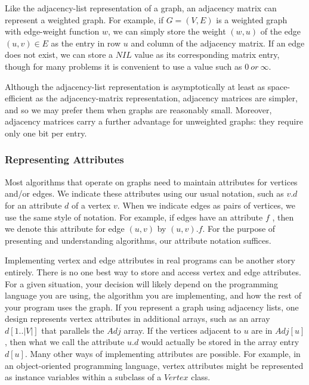\documentclass[12pt,a4paper]{book}
\begin{document}
Like the adjacency-list representation of a graph, an adjacency matrix can represent a weighted graph. For example, if $G = (V, E)$ is a weighted graph with edge-weight function $w$, we can simply store the weight $(w, u)$ of the edge $(u,v) \in E$ as the entry in row $u$ and column of the adjacency matrix. If an edge does not exist, we can store a $NIL$ value as its corresponding matrix entry, though for many problems it is convenient to use a value such as $0\ or\ \infty$.\par
Although the adjacency-list representation is asymptotically at least as space-efficient as the adjacency-matrix representation, adjacency matrices are simpler, and so we may prefer them when graphs are reasonably small. Moreover, adjacency matrices carry a further advantage for unweighted graphs: they require only one bit per entry.
\subsubsection{Representing Attributes}
Most algorithms that operate on graphs need to maintain attributes for vertices and/or edges. We indicate these attributes using our usual notation, such as $v.d$ for an attribute $d$ of a vertex $v$. When we indicate edges as pairs of vertices, we use the same style of notation. For example, if edges have an attribute $f$ , then we denote this attribute for edge $(u,v)$ by $(u,v).f$. For the purpose of presenting and understanding algorithms, our attribute notation suffices.\par
Implementing vertex and edge attributes in real programs can be another story entirely. There is no one best way to store and access vertex and edge attributes. For a given situation, your decision will likely depend on the programming language you are using, the algorithm you are implementing, and how the rest of your program uses the graph. If you represent a graph using adjacency lists, one design represents vertex attributes in additional arrays, such as an array $d[1 .. |V|]$ that parallels the $Adj$ array. If the vertices adjacent to $u$ are in $Adj[u]$ , then what we call the attribute $u.d$ would actually be stored in the array entry $d[u]$. Many other ways of implementing attributes are possible. For example, in an object-oriented programming language, vertex attributes might be represented as instance variables within a subclass of a $Vertex$ class.
\end{document}
